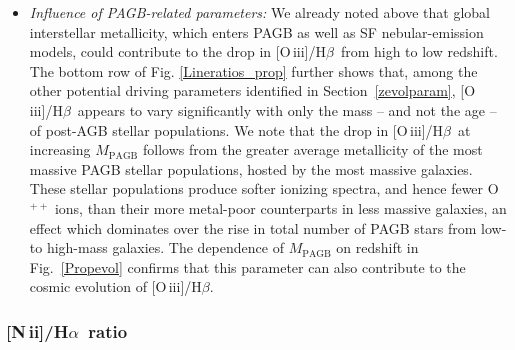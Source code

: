 \documentclass[fleqn,usenatbib]{mnras}
\newcommand{\oiiihb}{\hbox{[O\,{\sc iii}]/H$\beta$}}
\newcommand{\niiha}{\hbox{[N\,{\sc ii}]/H$\alpha$}}
\begin{document}
\begin{itemize}
\item{\it Influence of PAGB-related parameters:}
We already noted above that global interstellar metallicity, which
enters PAGB as well  as SF nebular-emission models, could contribute
to the drop in \oiiihb\ from high to low redshift. The bottom row of
Fig. \ref{Lineratios_prop} further shows that,  among the other
potential driving parameters identified in Section~\ref{zevolparam},
\oiiihb\ appears to vary significantly with only the mass -- and not
the age -- of post-AGB stellar populations. We note that the drop in
\oiiihb\ at increasing $M_\mathrm{PAGB}$  follows from the greater
average metallicity of the most massive PAGB stellar populations,
hosted by the most massive galaxies. These stellar populations
produce softer ionizing spectra, and hence fewer O$^{++}$ ions,
than their more metal-poor  counterparts in less massive galaxies, an
effect which dominates over the rise in  total number of PAGB stars
from low- to high-mass galaxies. The dependence of  $M_\mathrm{PAGB}$
on redshift in Fig.~\ref{Propevol} confirms that this parameter can
also contribute to the cosmic evolution of \oiiihb. 

\end{itemize}


\subsubsection{\niiha\ ratio}\label{NII} 
\end{document}

